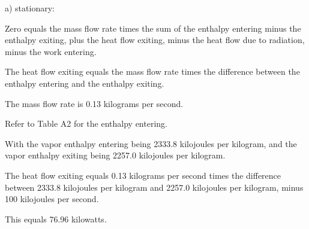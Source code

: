 a) stationary:

Zero equals the mass flow rate times the sum of the enthalpy entering minus the enthalpy exiting, plus the heat flow exiting, minus the heat flow due to radiation, minus the work entering.

The heat flow exiting equals the mass flow rate times the difference between the enthalpy entering and the enthalpy exiting.

The mass flow rate is 0.13 kilograms per second.

Refer to Table A2 for the enthalpy entering.

With the vapor enthalpy entering being 2333.8 kilojoules per kilogram, and the vapor enthalpy exiting being 2257.0 kilojoules per kilogram.

The heat flow exiting equals 0.13 kilograms per second times the difference between 2333.8 kilojoules per kilogram and 2257.0 kilojoules per kilogram, minus 100 kilojoules per second.

This equals 76.96 kilowatts.